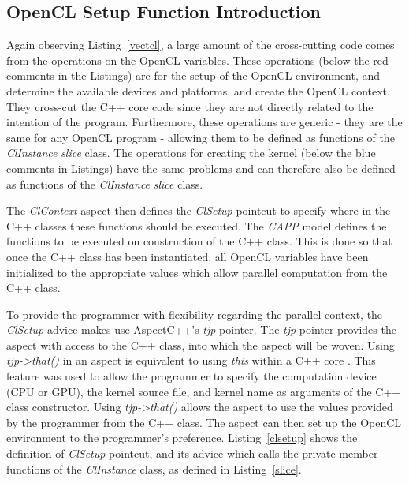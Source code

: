 \documentclass{sig-alternate-05-2015}
\begin{document}
\subsection{OpenCL Setup Function Introduction}

Again observing Listing~\ref{vectcl}, a large amount of the cross-cutting code
comes from the operations on the OpenCL variables. These operations (below the
red comments in the Listings) are for the setup of the OpenCL environment, and 
determine the available devices and platforms, and create the OpenCL context. They
cross-cut the C++ core code since they are not directly related to the intention of the
program. Furthermore, these operations are generic - they are the same for any 
OpenCL program - allowing them to be defined as functions of the \textit{ClInstance} 
\textit{slice} class. The operations for creating the kernel (below the blue 
comments in Listings) have the same problems and can therefore also be defined
as functions of the \textit{ClInstance} \textit{slice} class. 

The \textit{ClContext} aspect then defines the \textit{ClSetup} pointcut to
specify where in the C++ classes these functions should be executed. The
\textit{CAPP} model defines the functions to be executed on construction of the
C++ class. This is done so that once the C++ class has been instantiated,
all OpenCL variables have been initialized to the appropriate values which allow
parallel computation from the C++ class. 

To provide the programmer with flexibility regarding the parallel context,
the \textit{ClSetup} advice makes use AspectC++'s \textit{tjp} pointer. 
The \textit{tjp} pointer provides the aspect with access to the C++ class, 
into which the aspect will be woven. Using \textit{tjp->that()} in an aspect 
is equivalent to using \textit{this} within a C++ core . This feature was used 
to allow the programmer to specify the computation device (CPU or GPU), the 
kernel source file, and kernel name as arguments of the C++ class constructor. 
Using \textit{tjp->that()} allows the aspect to use the values provided by the 
programmer from the C++ class. The aspect can then set up the OpenCL environment
to the programmer's preference.
Listing~\ref{clsetup} shows the definition of \textit{ClSetup} pointcut, and its 
advice which calls the private member functions of the \textit{ClInstance}
class, as defined in Listing~\ref{slice}.
\end{document}
